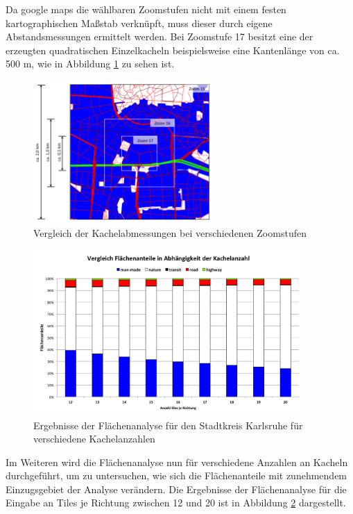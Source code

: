 %
Da google maps die wählbaren Zoomstufen nicht mit einem festen kartographischen Maßstab verknüpft, muss dieser durch eigene Abstandsmessungen ermittelt werden. Bei Zoomstufe 17 besitzt eine der erzeugten quadratischen Einzelkacheln beispielsweise eine Kantenlänge von ca. \num{500} \si{\metre}, wie in Abbildung \ref{fig:Zoomvgl} zu sehen ist.\\
%
\begin{figure}
  \centering
    \includegraphics[width=0.6\textwidth]{images/3_Zoomvergleich_KA.png}
    \caption{Vergleich der Kachelabmessungen bei verschiedenen Zoomstufen}
    \label{fig:Zoomvgl}
\end{figure}
%
%
\newline
\begin{figure}
  \centering
    \includegraphics[width=0.92\textwidth]{images/3_Kachelvergleich_KA.png}
    \caption{Ergebnisse der Flächenanalyse für den Stadtkreis Karlsruhe für verschiedene Kachelanzahlen}
    \label{fig:Kachel_vgl}
\end{figure}
%
Im Weiteren wird die Flächenanalyse nun für verschiedene Anzahlen an Kacheln durchgeführt, um zu untersuchen, wie sich die Flächenanteile mit zunehmendem Einzugsgebiet der Analyse verändern. Die Ergebnisse der Flächenanalyse für die Eingabe an Tiles je Richtung zwischen 12 und 20 ist in Abbildung \ref{fig:Kachel_vgl} dargestellt.\\
